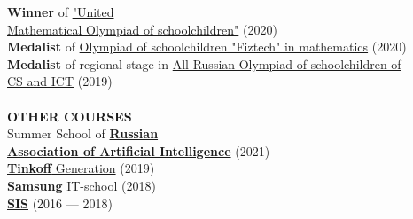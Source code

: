 \documentclass{article}
\begin{document}
\begin{vwcol}[widths={0.8,0.2},
 sep=.8cm, justify=flush,rule=0pt,indent=1em]
\textbf{Winner} of \href{https://olympiads.mccme.ru/ommo/23/}{"United\\Mathematical Olympiad of schoolchildren"} (2020)\\
\textbf{Medalist} of \href{https://olymp.mipt.ru/}{Olympiad of schoolchildren "Fiztech" in mathematics} (2020)\\
\textbf{Medalist} of regional stage in \href{https://vos.olimpiada.ru/}{All-Russian Olympiad of schoolchildren of\\
 CS and ICT} (2019)\\
\\
\noindent\textcolor[rgb]{0.1255,0.2902,0.7843}{\textbf{OTHER COURSES}}\\
Summer School of \href{https://raai.space/}{\textbf{Russian\\
Association of Artificial Intelligence}} (2021)\\
\href{https://fintech.tinkoff.ru/school/generation/}{\textbf{Tinkoff} Generation} (2019)\\
\href{https://myitschool.ru/}{\textbf{Samsung} IT-school} (2018)\\
\href{https://lksh.ru/}{\textbf{SIS}} (2016 — 2018)\\
\end{vwcol} 
\end{document}
